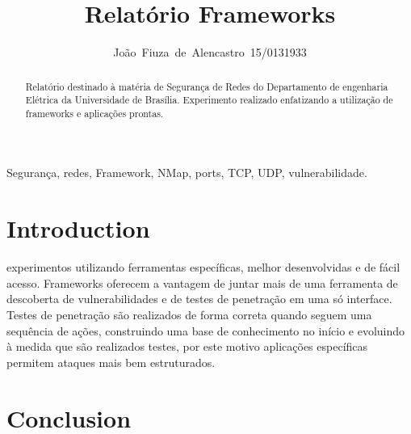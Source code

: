 \documentclass[journal]{IEEEtran}
\begin{document}
\title{Relatório Frameworks}


\author{João~Fiuza~de~Alencastro~15/0131933}%




\maketitle


\begin{abstract}
Relatório destinado à matéria de Segurança de Redes do Departamento de engenharia Elétrica da Universidade de Brasília. Experimento realizado enfatizando a utilização de frameworks e aplicações prontas.
\end{abstract}

\begin{IEEEkeywords}
Segurança, redes, Framework, NMap, ports, TCP, UDP, vulnerabilidade.
\end{IEEEkeywords}


\IEEEpeerreviewmaketitle



\section{Introduction}
 experimentos utilizando ferramentas específicas, melhor desenvolvidas e de fácil acesso. Frameworks oferecem a vantagem de juntar mais de uma ferramenta de descoberta de vulnerabilidades e de testes de penetração em uma só interface. Testes de penetração são realizados de forma correta quando seguem uma sequência de ações, construindo uma base de conhecimento no início e evoluindo à medida que são realizados testes, por este motivo aplicações específicas permitem ataques mais bem estruturados.


\section{Conclusion}



\begin{thebibliography}{1}

\bibitem{}


\end{thebibliography}
\end{document}
